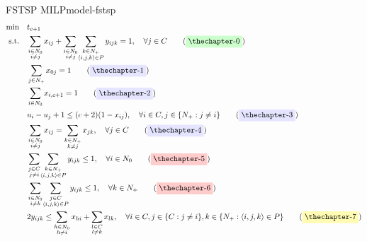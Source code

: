 {
\newcommand{\mySubstack}[1]{\mathclap{\substack{#1}}}
\newcommand{\myYellowTag}[1]{\label{#1}\tag{\colorbox{shallow-yellow}{\theequation}}\addtocounter{equation}{1}}
\newcommand{\myRedTag}[1]{\label{#1}\tag{\colorbox{shallow-red}{\theequation}}\addtocounter{equation}{1}}
\newcommand{\myGreenTag}[1]{\label{#1}\tag{\colorbox{shallow-green}{\theequation}}\addtocounter{equation}{1}}
\newcommand{\myPurpleTag}[1]{\label{#1}\tag{\colorbox{shallow-purple}{\theequation}}\addtocounter{equation}{1}}

\begin{model}{FSTSP MILP}{model-fstsp}
\begin{align}
    \min \quad & t_{c + 1}  \label{eq:fstsp-obj}\\
    \text{s.t.} \quad & 
        \sum_{\substack{i\in N_{0}\\i\neq j}}x_{ij}+\sum_{\substack{i\in N_{0}\\ i\neq j}}\!\sum_{\substack{k \in N_{+}\\ \langle i,j,k \rangle \in P}}y_{ijk}=1, \quad \forall j \in C\myGreenTag{eq:fstsp-customer-visit}\\
    \quad & 
        \sum_{j\in N_{+}}x_{0j}=1\myPurpleTag{eq:fstsp-truck-start}\\
    \quad & 
        \sum_{i\in N_{0}}x_{i,c + 1}=1\myPurpleTag{eq:fstsp-truck-return}\\
    \quad & 
        u_i - u_j + 1 \leq (c + 2)(1 - x_{ij}), \quad \forall i \in C, j \in \{N_{+}:j \neq i\}\myPurpleTag{eq:fstsp-truck-mtz}\\
    \quad & 
        \sum_{\substack{i\in N_{0}\\ i \neq j}}x_{ij}=\sum_{\substack{k\in N_{+}\\k\neq j}}x_{jk}, \quad \forall j \in C\myPurpleTag{eq:fstsp-truck-continuity}\\
    \quad & 
        \sum_{\substack{j\in C\\j \neq i}}\!\sum_{\substack{k\in N_{+}\\\langle i,j,k \rangle\in P}}y_{ijk}\leq1, \quad \forall i\in N_{0}\myRedTag{eq:fstsp-drone-land}\\
    \quad & 
        \sum_{\substack{i\in N_{0}\\i\neq k}}\!\sum_{\substack{j\in C\\\langle i,j,k \rangle\in P}}y_{ijk}\leq1, \quad \forall k \in N_{+}\myRedTag{eq:fstsp-drone-takeoff}\\
    \quad & 
        2 y_{ijk} \leq \sum_{\substack{h \in N_0 \\ h \neq i}}x_{hi} + \sum_{\substack{l \in C\\ l \neq k}}x_{lk}, \quad \forall i \in C, j \in \{C: j \neq i\}, k \in \{N_{+}: \langle i,j,k \rangle \in P\}\myYellowTag{eq:fstsp-drone-truck-meet}\\

\end{align}
\end{model}}
